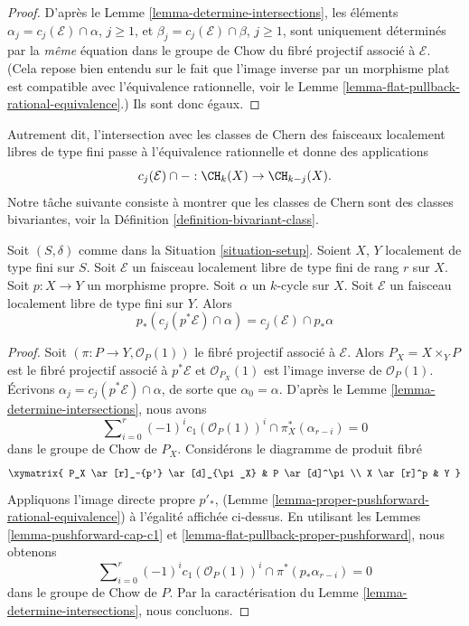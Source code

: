 \begin{proof}
D'après le Lemme \ref{lemma-determine-intersections}, les éléments
$\alpha_j = c_j(\mathcal{E}) \cap \alpha$, $j \geq 1$, et
$\beta_j = c_j(\mathcal{E}) \cap \beta$, $j \geq 1$, sont uniquement déterminés
par la {\it même} équation dans le groupe de Chow du fibré
projectif associé à $\mathcal{E}$. (Cela repose bien entendu sur le fait que
l'image inverse par un morphisme plat est compatible avec l'équivalence rationnelle, voir le
Lemme \ref{lemma-flat-pullback-rational-equivalence}.) Ils sont donc égaux.
\end{proof}

\noindent
Autrement dit, l'intersection avec les classes de Chern des
faisceaux localement libres de type fini passe à l'équivalence rationnelle
et donne des applications
$$
c_j(\mathcal{E}) \cap - : \CH_k(X) \to \CH_{k - j}(X).
$$
Notre tâche suivante consiste à montrer que les classes de Chern sont des classes bivariantes, voir
la Définition \ref{definition-bivariant-class}.

\begin{lemma}
\label{lemma-pushforward-cap-cj}
Soit $(S, \delta)$ comme dans la Situation \ref{situation-setup}.
Soient $X$, $Y$ localement de type fini sur $S$.
Soit $\mathcal{E}$ un faisceau localement libre de type fini de rang $r$ sur $X$.
Soit $p : X \to Y$ un morphisme propre.
Soit $\alpha$ un $k$-cycle sur $X$.
Soit $\mathcal{E}$ un faisceau localement libre de type fini sur $Y$.
Alors
$$
p_*(c_j(p^*\mathcal{E}) \cap \alpha) = c_j(\mathcal{E}) \cap p_*\alpha
$$
\end{lemma}

\begin{proof}
Soit $(\pi : P \to Y, \mathcal{O}_P(1))$ le fibré projectif associé
à $\mathcal{E}$. Alors $P_X = X \times_Y P$ est le fibré projectif associé
à $p^*\mathcal{E}$ et $\mathcal{O}_{P_X}(1)$ est l'image inverse de
$\mathcal{O}_P(1)$. Écrivons $\alpha_j = c_j(p^*\mathcal{E}) \cap \alpha$, de sorte que
$\alpha_0 = \alpha$. D'après le Lemme \ref{lemma-determine-intersections}, nous avons
$$
\sum\nolimits_{i = 0}^r
(-1)^i c_1(\mathcal{O}_P(1))^i \cap
\pi_X^*(\alpha_{r - i}) = 0
$$
dans le groupe de Chow de $P_X$. Considérons le diagramme de produit fibré
$$
\xymatrix{
P_X \ar[r]_-{p'} \ar[d]_{\pi_X} & P \ar[d]^\pi \\
X \ar[r]^p & Y
}
$$
Appliquons l'image directe propre $p'_*$,
(Lemme \ref{lemma-proper-pushforward-rational-equivalence})
à l'égalité affichée ci-dessus. En utilisant les
Lemmes \ref{lemma-pushforward-cap-c1} et
\ref{lemma-flat-pullback-proper-pushforward}, nous obtenons
$$
\sum\nolimits_{i = 0}^r
(-1)^i c_1(\mathcal{O}_P(1))^i \cap
\pi^*(p_*\alpha_{r - i}) = 0
$$
dans le groupe de Chow de $P$. Par la caractérisation du
Lemme \ref{lemma-determine-intersections}, nous concluons.
\end{proof}

